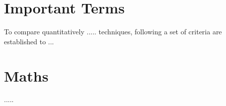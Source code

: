 
\appendix
\chapter{Important Terms}
To compare quantitatively ..... techniques, following a set of criteria are established to ...


\chapter{Maths}
.....